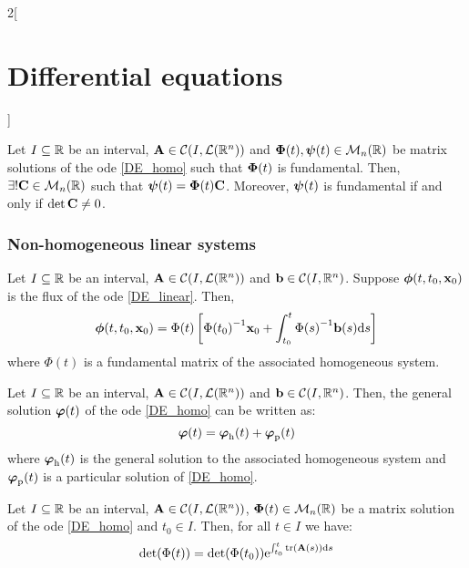 \documentclass[../../../main.tex]{subfiles}
\begin{document}
\begin{multicols}{2}[\section{Differential equations}]
\begin{prop}
\begin{enumerate}
    \end{enumerate}
  \end{prop}
  \begin{prop}
    Let $I\subseteq \mathbb{R}$ be an interval, $\boldsymbol{\mathrm{A}}\in\mathcal{C}(I,\mathcal{L}(\mathbb{R}^n))$ and $\boldsymbol{\mathrm{\Phi}}(t),\boldsymbol{\mathrm{\psi}}(t)\in\mathcal{M}_n(\mathbb{R})$ be matrix solutions of the ode \eqref{DE_homo} such that $\boldsymbol{\mathrm{\Phi}}(t)$ is fundamental. Then, $\exists! \boldsymbol{\mathrm{C}}\in\mathcal{M}_n(\mathbb{R})$ such that $\boldsymbol{\mathrm{\psi}}(t)=\boldsymbol{\mathrm{\Phi}}(t)\boldsymbol{\mathrm{C}}$. Moreover, $\boldsymbol{\mathrm{\psi}}(t)$ is fundamental if and only if $\det \boldsymbol{\mathrm{C}}\ne 0$.
  \end{prop}
  \subsubsection{Non-homogeneous linear systems}
  \begin{prop}
    Let $I\subseteq \mathbb{R}$ be an interval, $\boldsymbol{\mathrm{A}}\in\mathcal{C}(I,\mathcal{L}(\mathbb{R}^n))$ and $\boldsymbol{\mathrm{b}}\in\mathcal{C}(I,\mathbb{R}^n)$. Suppose $\boldsymbol{\mathrm{\phi}}(t,t_0,\boldsymbol{\mathrm{x}}_0)$ is the flux of the ode \eqref{DE_linear}. Then, $$\boldsymbol{\mathrm{\phi}}(t,t_0,\boldsymbol{\mathrm{x}}_0)=\Phi(t)\left[{\Phi(t_0)}^{-1}\boldsymbol{\mathrm{x}}_0+\int_{t_0}^t{\Phi(s)}^{-1}\boldsymbol{\mathrm{b}}(s)\dd s\right]$$ where $\Phi(t)$ is a fundamental matrix of the associated homogeneous system.
  \end{prop}
  \begin{corollary}
    Let $I\subseteq \mathbb{R}$ be an interval, $\boldsymbol{\mathrm{A}}\in\mathcal{C}(I,\mathcal{L}(\mathbb{R}^n))$ and $\boldsymbol{\mathrm{b}}\in\mathcal{C}(I,\mathbb{R}^n)$. Then, the general solution $\boldsymbol{\mathrm{\varphi}}(t)$ of the ode \eqref{DE_homo} can be written as: $$\boldsymbol{\mathrm{\varphi}}(t)=\boldsymbol{\mathrm{\varphi}}_\mathrm{h}(t)+\boldsymbol{\mathrm{\varphi}}_\mathrm{p}(t)$$ where $\boldsymbol{\mathrm{\varphi}}_\mathrm{h}(t)$ is the general solution to the associated homogeneous system and $\boldsymbol{\mathrm{\varphi}}_\mathrm{p}(t)$ is a particular solution of \eqref{DE_homo}.
  \end{corollary}
  \begin{prop}
    Let $I\subseteq \mathbb{R}$ be an interval, $\boldsymbol{\mathrm{A}}\in\mathcal{C}(I,\mathcal{L}(\mathbb{R}^n))$, $\boldsymbol{\mathrm{\Phi}}(t)\in\mathcal{M}_n(\mathbb{R})$ be a matrix solution of the ode \eqref{DE_homo} and $t_0\in I$. Then, for all $t\in I$ we have: $$\det(\Phi(t))=\det (\Phi(t_0))\exp{\int_{t_0}^t\trace(\vectorfunction{A}(s))\dd s}$$
  \end{prop}

\end{multicols}
\end{document}
